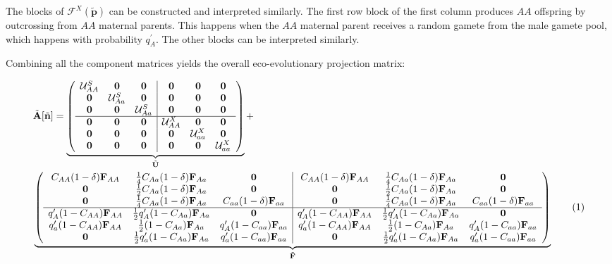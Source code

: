 \documentclass[11pt]{article}
\newcommand\numberthis{\addtocounter{equation}{1}\tag{\theequation}}
\def\mbf#1{\mathbf{#1}}
\def\mcal#1{\mathcal{#1}}
\begin{document}
The blocks of $\mcal{F}^X(\tilde{\mbf{p}})$ can be constructed and interpreted similarly. The first row block of the first column produces $AA$ offspring by outcrossing from $AA$ maternal parents. This happens when the $AA$ maternal parent receives a random gamete from the male gamete pool, which happens with probability $q^{\prime}_{A}$. The other blocks can be interpreted similarly.

Combining all the component matrices yields the overall eco-evolutionary projection matrix:

\begin{align*}
	&\tilde{\mbf{A}}[\tilde{\mbf{n}}] = 
		 \underbrace{\left(
			\begin{array}{ccc|ccc}
				\mcal{U}^S_{AA} & \mbf{0} & \mbf{0} & \mbf{0} & \mbf{0} & \mbf{0} \\ 
				\mbf{0} & \mcal{U}^S_{Aa} & \mbf{0} & \mbf{0} & \mbf{0} & \mbf{0} \\
				\mbf{0} & \mbf{0} & \mcal{U}^S_{Aa} & \mbf{0} & \mbf{0} & \mbf{0} \\ \hline
				\mbf{0} & \mbf{0} & \mbf{0} & \mcal{U}^X_{AA} & \mbf{0} & \mbf{0} \\
				\mbf{0} & \mbf{0} & \mbf{0} & \mbf{0} & \mcal{U}^X_{aa} & \mbf{0}\\
				\mbf{0} & \mbf{0} & \mbf{0} & \mbf{0} & \mbf{0} & \mcal{U}^X_{aa}
			\end{array} \right)}_{\tilde{\mbf{U}}} + \\ 
	&\underbrace{\left(
			\begin{array}{ccc|ccc}
				C_{AA} (1 - \delta) \mbf{F}_{AA} & \frac{1}{4} C_{Aa} (1 - \delta) \mbf{F}_{Aa} & \mbf{0} & C_{AA} (1 - \delta) \mbf{F}_{AA} & \frac{1}{4} C_{Aa} (1 - \delta) \mbf{F}_{Aa} & \mbf{0} \\ 
				\mbf{0} & \frac{1}{2} C_{Aa} (1 - \delta) \mbf{F}_{Aa} & \mbf{0} & \mbf{0} & \frac{1}{2} C_{Aa} (1 - \delta) \mbf{F}_{Aa} & \mbf{0}  \\
				\mbf{0} & \frac{1}{4} C_{Aa} (1 - \delta) \mbf{F}_{Aa} & C_{aa} (1 - \delta) \mbf{F}_{aa} & \mbf{0} & \frac{1}{4} C_{Aa} (1 - \delta) \mbf{F}_{Aa} & C_{aa} (1 - \delta) \mbf{F}_{aa} \\ \hline
				q^{\prime}_{A} (1 - C_{AA})\mbf{F}_{AA} & \frac{1}{2} q^{\prime}_{A} (1 - C_{Aa})\mbf{F}_{Aa}  & \mbf{0} & q^{\prime}_{A} (1 - C_{AA}) \mbf{F}_{AA}& \frac{1}{2} q^{\prime}_{A} (1 - C_{Aa}) \mbf{F}_{Aa} & \mbf{0} \\
				q^{\prime}_{a} (1 - C_{AA}) \mbf{F}_{AA} & \frac{1}{2} (1 - C_{Aa})\mbf{F}_{Aa}  & q^{\prime}_{A} (1 - C_{aa})\mbf{F}_{aa}  & q^{\prime}_{a} (1 - C_{AA}) \mbf{F}_{AA} & \frac{1}{2}(1 - C_{Aa}) \mbf{F}_{Aa}  & q^{\prime}_{A} (1 - C_{aa})\mbf{F}_{aa}  \\
				\mbf{0} & \frac{1}{2} q^{\prime}_{a} (1 - C_{Aa})\mbf{F}_{Aa} & q^{\prime}_{a} (1 - C_{aa}) \mbf{F}_{aa} & \mbf{0} & \frac{1}{2} q^{\prime}_{a} (1 - C_{Aa})\mbf{F}_{Aa} & q^{\prime}_{a} (1 - C_{aa})\mbf{F}_{aa} 
			\end{array} \right)}_{\tilde{\mbf{F}}} \numberthis
\end{align*}
\end{document}
